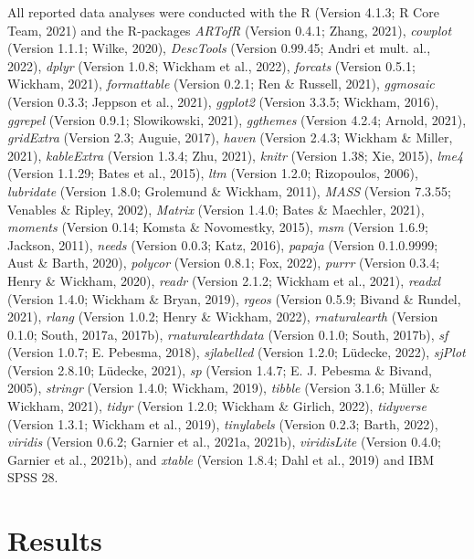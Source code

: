 \documentclass[
  man]{apa6}
\begin{document}
All reported data analyses were conducted with the R (Version 4.1.3; R Core Team, 2021) and the R-packages \emph{ARTofR} (Version 0.4.1; Zhang, 2021), \emph{cowplot} (Version 1.1.1; Wilke, 2020), \emph{DescTools} (Version 0.99.45; Andri et mult. al., 2022), \emph{dplyr} (Version 1.0.8; Wickham et al., 2022), \emph{forcats} (Version 0.5.1; Wickham, 2021), \emph{formattable} (Version 0.2.1; Ren \& Russell, 2021), \emph{ggmosaic} (Version 0.3.3; Jeppson et al., 2021), \emph{ggplot2} (Version 3.3.5; Wickham, 2016), \emph{ggrepel} (Version 0.9.1; Slowikowski, 2021), \emph{ggthemes} (Version 4.2.4; Arnold, 2021), \emph{gridExtra} (Version 2.3; Auguie, 2017), \emph{haven} (Version 2.4.3; Wickham \& Miller, 2021), \emph{kableExtra} (Version 1.3.4; Zhu, 2021), \emph{knitr} (Version 1.38; Xie, 2015), \emph{lme4} (Version 1.1.29; Bates et al., 2015), \emph{ltm} (Version 1.2.0; Rizopoulos, 2006), \emph{lubridate} (Version 1.8.0; Grolemund \& Wickham, 2011), \emph{MASS} (Version 7.3.55; Venables \& Ripley, 2002), \emph{Matrix} (Version 1.4.0; Bates \& Maechler, 2021), \emph{moments} (Version 0.14; Komsta \& Novomestky, 2015), \emph{msm} (Version 1.6.9; Jackson, 2011), \emph{needs} (Version 0.0.3; Katz, 2016), \emph{papaja} (Version 0.1.0.9999; Aust \& Barth, 2020), \emph{polycor} (Version 0.8.1; Fox, 2022), \emph{purrr} (Version 0.3.4; Henry \& Wickham, 2020), \emph{readr} (Version 2.1.2; Wickham et al., 2021), \emph{readxl} (Version 1.4.0; Wickham \& Bryan, 2019), \emph{rgeos} (Version 0.5.9; Bivand \& Rundel, 2021), \emph{rlang} (Version 1.0.2; Henry \& Wickham, 2022), \emph{rnaturalearth} (Version 0.1.0; South, 2017a, 2017b), \emph{rnaturalearthdata} (Version 0.1.0; South, 2017b), \emph{sf} (Version 1.0.7; E. Pebesma, 2018), \emph{sjlabelled} (Version 1.2.0; Lüdecke, 2022), \emph{sjPlot} (Version 2.8.10; Lüdecke, 2021), \emph{sp} (Version 1.4.7; E. J. Pebesma \& Bivand, 2005), \emph{stringr} (Version 1.4.0; Wickham, 2019), \emph{tibble} (Version 3.1.6; Müller \& Wickham, 2021), \emph{tidyr} (Version 1.2.0; Wickham \& Girlich, 2022), \emph{tidyverse} (Version 1.3.1; Wickham et al., 2019), \emph{tinylabels} (Version 0.2.3; Barth, 2022), \emph{viridis} (Version 0.6.2; Garnier et al., 2021a, 2021b), \emph{viridisLite} (Version 0.4.0; Garnier et al., 2021b), and \emph{xtable} (Version 1.8.4; Dahl et al., 2019) and IBM SPSS 28.

\hypertarget{results}{%
\section{Results}\label{results}}
\end{document}
